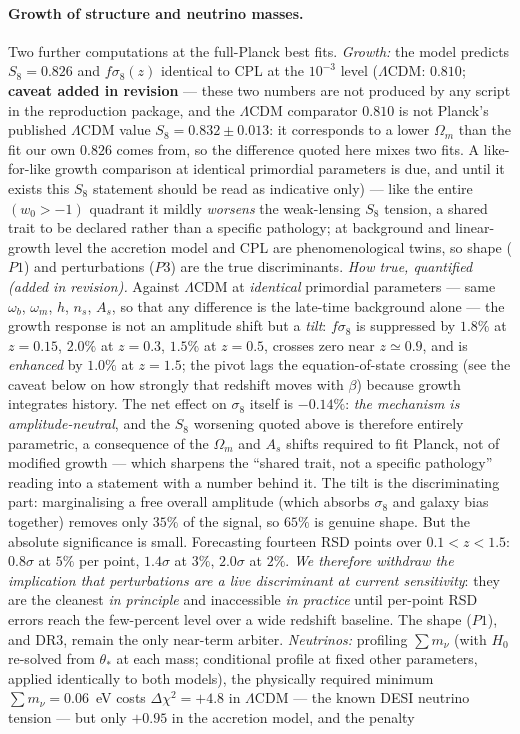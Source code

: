 \documentclass[11pt]{article}
\begin{document}
\paragraph{Growth of structure and neutrino masses.} Two further computations at the full-Planck best fits. \emph{Growth:} the model predicts $S_8 = 0.826$ and $f\sigma_8(z)$ identical to CPL at the $10^{-3}$ level ($\Lambda$CDM: $0.810$; \textbf{caveat added in revision} --- these two numbers are not produced by any script in the reproduction package, and the $\Lambda$CDM comparator $0.810$ is not Planck's published $\Lambda$CDM value $S_8 = 0.832 \pm 0.013$: it corresponds to a lower $\Omega_m$ than the fit our own $0.826$ comes from, so the difference quoted here mixes two fits. A like-for-like growth comparison at identical primordial parameters is due, and until it exists this $S_8$ statement should be read as indicative only) --- like the entire $(w_0>-1)$ quadrant it mildly \emph{worsens} the weak-lensing $S_8$ tension, a shared trait to be declared rather than a specific pathology; at background and linear-growth level the accretion model and CPL are phenomenological twins, so shape ($P1$) and perturbations ($P3$) are the true discriminants. \emph{How true, quantified (added in revision).} Against $\Lambda$CDM at \emph{identical} primordial parameters --- same $\omega_b$, $\omega_m$, $h$, $n_s$, $A_s$, so that any difference is the late-time background alone --- the growth response is not an amplitude shift but a \emph{tilt}: $f\sigma_8$ is suppressed by $1.8\%$ at $z=0.15$, $2.0\%$ at $z=0.3$, $1.5\%$ at $z=0.5$, crosses zero near $z \simeq 0.9$, and is \emph{enhanced} by $1.0\%$ at $z=1.5$; the pivot lags the equation-of-state crossing (see the caveat below on how strongly that redshift moves with $\beta$) because growth integrates history. The net effect on $\sigma_8$ itself is $-0.14\%$: \emph{the mechanism is amplitude-neutral}, and the $S_8$ worsening quoted above is therefore entirely parametric, a consequence of the $\Omega_m$ and $A_s$ shifts required to fit Planck, not of modified growth --- which sharpens the ``shared trait, not a specific pathology'' reading into a statement with a number behind it. The tilt is the discriminating part: marginalising a free overall amplitude (which absorbs $\sigma_8$ and galaxy bias together) removes only $35\%$ of the signal, so $65\%$ is genuine shape. But the absolute significance is small. Forecasting fourteen RSD points over $0.1 < z < 1.5$: $0.8\sigma$ at $5\%$ per point, $1.4\sigma$ at $3\%$, $2.0\sigma$ at $2\%$. \emph{We therefore withdraw the implication that perturbations are a live discriminant at current sensitivity}: they are the cleanest \emph{in principle} and inaccessible \emph{in practice} until per-point RSD errors reach the few-percent level over a wide redshift baseline. The shape ($P1$), and DR3, remain the only near-term arbiter. \emph{Neutrinos:} profiling $\sum m_\nu$ (with $H_0$ re-solved from $\theta_*$ at each mass; conditional profile at fixed other parameters, applied identically to both models), the physically required minimum $\sum m_\nu = 0.06$~eV costs $\Delta\chi^2 = +4.8$ in $\Lambda$CDM --- the known DESI neutrino tension --- but only $+0.95$ in the accretion model, and the penalty 
\end{document}
